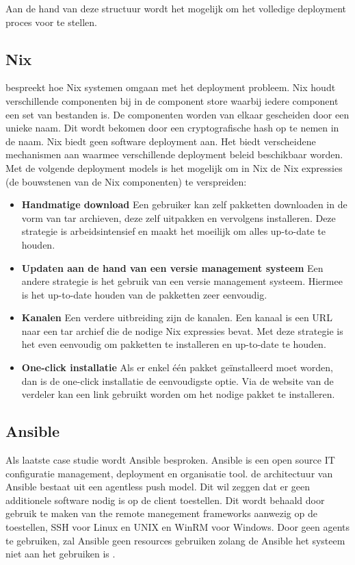 Aan de hand van deze structuur wordt het mogelijk om het volledige deployment proces voor te stellen.

\subsection{Nix}
\citet{dolstra2006purely} bespreekt hoe Nix systemen omgaan met het deployment probleem.
Nix houdt verschillende componenten bij in de component store waarbij iedere component een set van bestanden is.
De componenten worden van elkaar gescheiden door een unieke naam.
Dit wordt bekomen door een cryptografische hash op te nemen in de naam.
Nix biedt geen software deployment aan.
Het biedt verscheidene mechanismen aan waarmee verschillende deployment beleid beschikbaar worden.
Met de volgende deployment models is het mogelijk om in Nix de Nix expressies (de bouwstenen van de Nix componenten) te verspreiden:
\begin{itemize}
\item \textbf{Handmatige download} Een gebruiker kan zelf pakketten downloaden in de vorm van tar archieven, deze zelf uitpakken en vervolgens installeren.
Deze strategie is arbeidsintensief en maakt het moeilijk om alles up-to-date te houden. 
\item \textbf{Updaten aan de hand van een versie management systeem} Een andere strategie is het gebruik van een versie management systeem.
Hiermee is het up-to-date houden van de pakketten zeer eenvoudig.
\item \textbf{Kanalen} Een verdere uitbreiding zijn de kanalen.
Een kanaal is een URL naar een tar archief die de nodige Nix expressies bevat.
Met deze strategie is het even eenvoudig om pakketten te installeren en up-to-date te houden.
\item \textbf{One-click installatie} Als er enkel één pakket geïnstalleerd moet worden, dan is de one-click installatie de eenvoudigste optie.
Via de website van de verdeler kan een link gebruikt worden om het nodige pakket te installeren.
\end{itemize}

\subsection{Ansible}
Als laatste case studie wordt Ansible besproken.
Ansible is een open source IT configuratie management, deployment en organisatie tool.
de architectuur van Ansible bestaat uit een agentless push model.
Dit wil zeggen dat er geen additionele software nodig is op de client toestellen.
Dit wordt behaald door gebruik te maken van the remote manegement frameworks aanwezig op de toestellen, SSH voor Linux en UNIX en WinRM voor Windows.
Door geen agents te gebruiken, zal Ansible geen resources gebruiken zolang de Ansible het systeem niet aan het gebruiken is \citep{ansible}.

